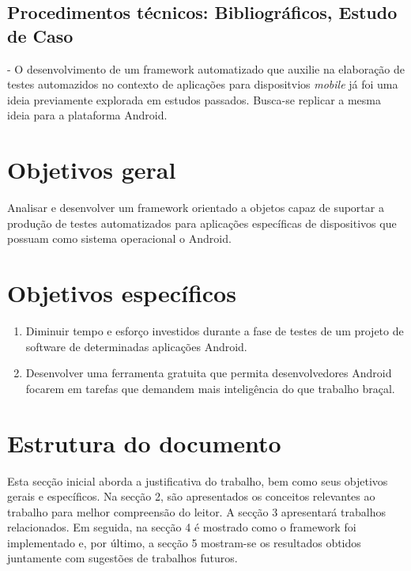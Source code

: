 \documentclass[
    12pt,       %
    openright,      %
    twoside,      %
    a4paper,      %
    english,      %
    french,       %
    spanish,      %
    brazil,       %
    ]{abntex2}
\begin{document}
    \subsection{Procedimentos técnicos: Bibliográficos, Estudo de Caso} - O desenvolvimento
    de um framework automatizado que auxilie na elaboração de testes automazidos no
    contexto de aplicações para dispositvios \textit{mobile} já foi uma ideia previamente
    explorada em estudos passados. Busca-se replicar a mesma ideia para a plataforma
    Android.

  \section{Objetivos geral}
      Analisar e desenvolver um framework orientado a objetos capaz de suportar a produção
      de testes automatizados para aplicações específicas de dispositivos que possuam como
      sistema operacional o Android.

  \section{Objetivos específicos}
  \begin{enumerate}
      \item Diminuir tempo e esforço investidos durante a fase de testes de um projeto de software
            de determinadas aplicações Android.
      \item Desenvolver uma ferramenta gratuita que permita desenvolvedores Android focarem
            em tarefas que demandem mais inteligência do que trabalho braçal.
  \end{enumerate}

  \section{Estrutura do documento}
      Esta secção inicial aborda a justificativa do trabalho, bem como seus
      objetivos gerais e específicos. Na secção 2, são apresentados os
      conceitos relevantes ao trabalho para melhor compreensão do leitor.
      A secção 3 apresentará trabalhos relacionados. Em seguida,
      na secção 4 é mostrado como o framework foi implementado e, por
      último, a secção 5 mostram-se os resultados obtidos juntamente com
      sugestões de trabalhos futuros.
\end{document}
